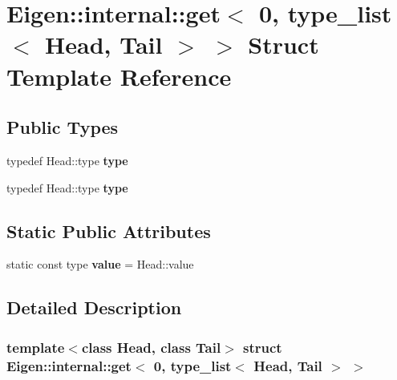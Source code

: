 \hypertarget{struct_eigen_1_1internal_1_1get_3_010_00_01type__list_3_01_head_00_01_tail_01_4_01_4}{}\section{Eigen\+:\+:internal\+:\+:get$<$ 0, type\+\_\+list$<$ Head, Tail $>$ $>$ Struct Template Reference}
\label{struct_eigen_1_1internal_1_1get_3_010_00_01type__list_3_01_head_00_01_tail_01_4_01_4}
\subsection*{Public Types}
\begin{DoxyCompactItemize}
\item 
\mbox{\label{struct_eigen_1_1internal_1_1get_3_010_00_01type__list_3_01_head_00_01_tail_01_4_01_4_ab0c21457b9c3e91527f8feff761d0570}} 
typedef Head\+::type {\bfseries type}
\item 
\mbox{\label{struct_eigen_1_1internal_1_1get_3_010_00_01type__list_3_01_head_00_01_tail_01_4_01_4_ab0c21457b9c3e91527f8feff761d0570}} 
typedef Head\+::type {\bfseries type}
\end{DoxyCompactItemize}
\subsection*{Static Public Attributes}
\begin{DoxyCompactItemize}
\item 
\mbox{\label{struct_eigen_1_1internal_1_1get_3_010_00_01type__list_3_01_head_00_01_tail_01_4_01_4_abb5ebed18bc59e43024908536d1f9a7b}} 
static const type {\bfseries value} = Head\+::value
\end{DoxyCompactItemize}


\subsection{Detailed Description}
\subsubsection*{template$<$class Head, class Tail$>$\newline
struct Eigen\+::internal\+::get$<$ 0, type\+\_\+list$<$ Head, Tail $>$ $>$}



